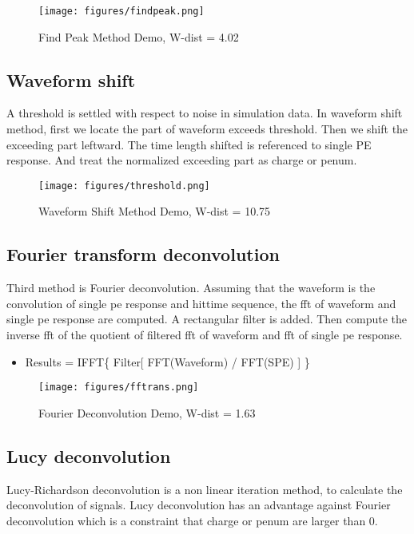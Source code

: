 \begin{figure}[H]
    \centering
    \texttt{[image: figures/findpeak.png]}
    \caption{Find Peak Method Demo, W-dist = 4.02}
\end{figure}

\subsection{Waveform shift}
A threshold is settled with respect to noise in simulation data. In waveform shift method, first we locate the part of waveform exceeds threshold. Then we shift the exceeding part leftward. The time length shifted is referenced to single PE response. And treat the normalized exceeding part as charge or penum. 

\begin{figure}[H]
    \centering
    \texttt{[image: figures/threshold.png]}
    \caption{Waveform Shift Method Demo, W-dist = 10.75}
\end{figure}

\subsection{Fourier transform deconvolution}
Third method is Fourier deconvolution. Assuming that the waveform is the convolution of single pe response and hittime sequence, the fft of waveform and single pe response are computed. A rectangular filter is added. Then compute the inverse fft of the quotient of filtered fft of waveform and fft of single pe response. 

\begin{itemize}
    \item Results = IFFT\{ Filter[ FFT(Waveform) / FFT(SPE) ] \}
\end{itemize}

\begin{figure}[H]
    \centering
    \texttt{[image: figures/fftrans.png]}
    \caption{Fourier Deconvolution Demo, W-dist = 1.63}
\end{figure}

\subsection{Lucy deconvolution}
Lucy-Richardson deconvolution is a non linear iteration method, to calculate the deconvolution of signals. Lucy deconvolution has an advantage against Fourier deconvolution which is a constraint that charge or penum are larger than 0. 

